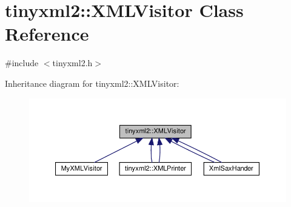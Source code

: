 \hypertarget{classtinyxml2_1_1XMLVisitor}{}\section{tinyxml2\+:\+:X\+M\+L\+Visitor Class Reference}
\label{classtinyxml2_1_1XMLVisitor}


{\ttfamily \#include $<$tinyxml2.\+h$>$}



Inheritance diagram for tinyxml2\+:\+:X\+M\+L\+Visitor\+:
\nopagebreak
\begin{figure}[H]
\begin{center}
\leavevmode
\includegraphics[width=350pt]{classtinyxml2_1_1XMLVisitor__inherit__graph}
\end{center}
\end{figure}
